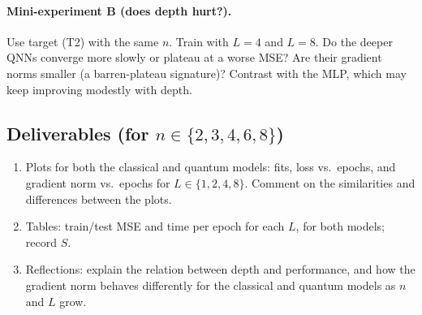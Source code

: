 \documentclass[11pt]{article}
\begin{document}
\paragraph{Mini-experiment B (does depth hurt?).}
Use target (T2) with the same $n$.
Train with $L=4$ and $L=8$. Do the deeper QNNs converge more slowly or plateau at a worse MSE? Are their gradient norms smaller (a barren-plateau signature)?
Contrast with the MLP, which may keep improving modestly with depth.

\subsection*{Deliverables (for $n \in \{2,3,4,6,8\}$)}
\begin{enumerate}[label=(\alph*)]
\item Plots for both the classical and quantum models: fits, loss vs.\ epochs, and gradient norm vs.\ epochs for $L\in\{1,2,4,8\}$. Comment on the similarities and differences between the plots.
\item Tables: train/test MSE and time per epoch for each $L$, for both models; record $S$.
\item Reflections: explain the relation between depth and performance, and how the gradient norm behaves differently for the classical and quantum models as $n$ and $L$ grow.
\end{enumerate}
\end{document}
